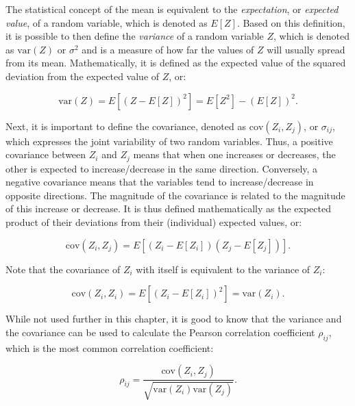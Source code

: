 The statistical concept of the mean is equivalent to the \emph{expectation}, or \emph{expected value}, of a random variable, which is denoted as \(E[Z]\).
Based on this definition, it is possible to then define the \emph{variance} of a random variable \(Z\), which is denoted as \(\mathrm{var}(Z)\) or \(\sigma^2\) and is a measure of how far the values of \(Z\) will usually spread from its mean.
Mathematically, it is defined as the expected value of the squared deviation from the expected value of \(Z\), or:

\begin{equation}
\mathrm{var}(Z) = E\left[{\left(Z-E\left[Z\right]\right)}^2\right] = E[Z^2]-{(E[Z])}^2.
\end{equation}

Next, it is important to define the covariance, denoted as \(\mathrm{cov}(Z_i,Z_j)\), or \(\sigma_{ij}\), which expresses the joint variability of two random variables.
Thus, a positive covariance between \(Z_i\) and \(Z_j\) means that when one increases or decreases, the other is expected to increase/decrease in the same direction.
Conversely, a negative covariance means that the variables tend to increase/decrease in opposite directions.
The magnitude of the covariance is related to the magnitude of this increase or decrease.
It is thus defined mathematically as the expected product of their deviations from their (individual) expected values, or:

\begin{equation}
\mathrm{cov}(Z_i,Z_j) = E\left[\left(Z_i-E[Z_i]\right)\left(Z_j-E[Z_j]\right)\right].
\end{equation}

Note that the covariance of \(Z_i\) with itself is equivalent to the variance of \(Z_i\):

\begin{equation}
\mathrm{cov}(Z_i,Z_i) = E\left[\left(Z_i-E[Z_i]\right)^2\right] = \mathrm{var}(Z_i).
\end{equation}

While not used further in this chapter, it is good to know that the variance and the covariance can be used to calculate the Pearson correlation coefficient \(\rho_{ij}\), which is the most common correlation coefficient:

\begin{equation}
\rho_{ij}=\frac{\mathrm{cov}(Z_i, Z_j)}{\sqrt{\mathrm{var}(Z_i) \mathrm{var}(Z_j)}}.
\end{equation}

